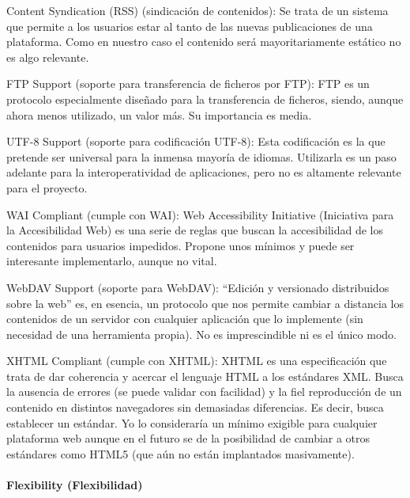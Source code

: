\par Content Syndication (RSS) (sindicación de contenidos): Se trata de un sistema que permite a los usuarios estar al tanto de las nuevas publicaciones de una plataforma. Como en nuestro caso el contenido será mayoritariamente estático no es algo relevante.

\par FTP Support (soporte para transferencia de ficheros por FTP): FTP es un protocolo especialmente diseñado para la transferencia de ficheros, siendo, aunque ahora menos utilizado, un valor más. Su importancia es media.

\par UTF-8 Support (soporte para codificación UTF-8): Esta codificación es la que pretende ser universal para la inmensa mayoría de idiomas. Utilizarla es un paso adelante para la interoperatividad de aplicaciones, pero no es altamente relevante para el proyecto.

\par WAI Compliant (cumple con WAI): Web Accessibility Initiative (Iniciativa para la Accesibilidad Web) es una serie de reglas que buscan la accesibilidad de los contenidos para usuarios impedidos. Propone unos mínimos y puede ser interesante implementarlo, aunque no vital.

\par WebDAV Support (soporte para WebDAV): ``Edición y versionado distribuidos sobre la web'' es, en esencia, un protocolo que nos permite cambiar a distancia los contenidos de un servidor con cualquier aplicación que lo implemente (sin necesidad de una herramienta propia). No es imprescindible ni es el único modo.

\par XHTML Compliant (cumple con XHTML): XHTML es una especificación que trata de dar coherencia y acercar el lenguaje HTML a los estándares XML. Busca la ausencia de errores (se puede validar con facilidad) y la fiel reproducción de un contenido en distintos navegadores sin demasiadas diferencias. Es decir, busca establecer un estándar. Yo lo consideraría un mínimo exigible para cualquier plataforma web aunque en el futuro se de la posibilidad de cambiar a otros estándares como HTML5 (que aún no están implantados masivamente).





\paragraph{Flexibility (Flexibilidad)}



